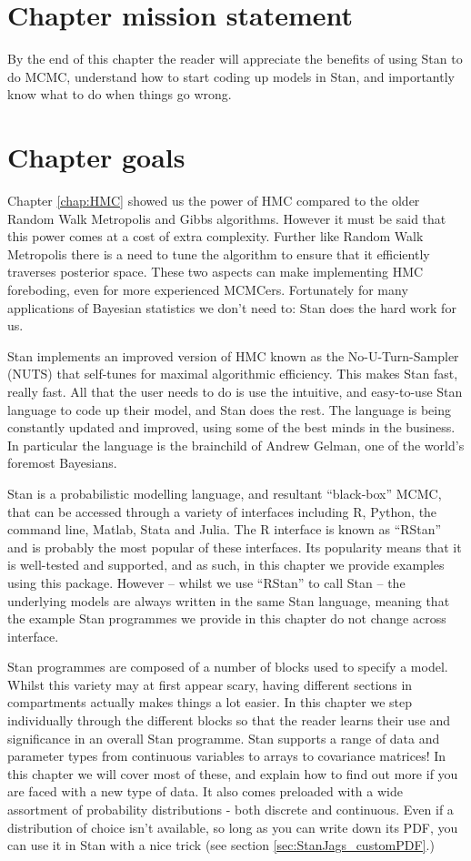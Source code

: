 \documentclass[11pt,fullpage]{book}
\begin{document}
\section{Chapter mission statement}
By the end of this chapter the reader will appreciate the benefits of using Stan to do MCMC, understand how to start coding up models in Stan, and importantly know what to do when things go wrong.
\section{Chapter goals}
Chapter \ref{chap:HMC} showed us the power of HMC compared to the older Random Walk Metropolis and Gibbs algorithms. However it must be said that this power comes at a cost of extra complexity. Further like Random Walk Metropolis there is a need to tune the algorithm to ensure that it efficiently traverses posterior space. These two aspects can make implementing HMC foreboding, even for more experienced MCMCers. Fortunately for many applications of Bayesian statistics we don't need to: Stan \citep{carpenter2016stan} does the hard work for us.

Stan implements an improved version of HMC known as the No-U-Turn-Sampler (NUTS) that self-tunes for maximal algorithmic efficiency. This makes Stan fast, really fast. All that the user needs to do is use the intuitive, and easy-to-use Stan language to code up their model, and Stan does the rest. The language is being constantly updated and improved, using some of the best minds in the business. In particular the language is the brainchild of Andrew Gelman, one of the world's foremost Bayesians. 

Stan is a probabilistic modelling language, and resultant ``black-box'' MCMC, that can be accessed through a variety of interfaces including R, Python, the command line, Matlab, Stata and Julia. The R interface is known as ``RStan'' and is probably the most popular of these interfaces. Its popularity means that it is well-tested and supported, and as such, in this chapter we provide examples using this package. However -- whilst we use ``RStan'' to call Stan -- the underlying models are always written in the same Stan language, meaning that the example Stan programmes we provide in this chapter do not change across interface.

Stan programmes are composed of a number of blocks used to specify a model. Whilst this variety may at first appear scary, having different sections in compartments actually makes things a lot easier. In this chapter we step individually through the different blocks so that the reader learns their use and significance in an overall Stan programme. Stan supports a range of data and parameter types from continuous variables to arrays to covariance matrices! In this chapter we will cover most of these, and explain how to find out more if you are faced with a new type of data. It also comes preloaded with a wide assortment of probability distributions - both discrete and continuous. Even if a distribution of choice isn't available, so long as you can write down its PDF, you can use it in Stan with a nice trick (see section \ref{sec:StanJags_customPDF}.)
\end{document}
